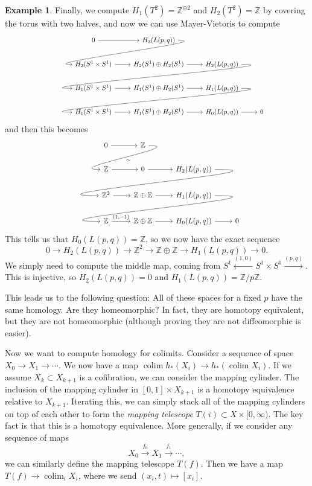 \documentclass[leqno, openany]{memoir}
\theoremstyle{definition}
\newtheorem{exm}[thm]{Example}
\theoremstyle{remark}
\theoremstyle{plain}
\theoremstyle{definition}
\theoremstyle{remark}
\newcommand{\Z}{\mathbb{Z}}
\DeclareMathOperator{\colim}{colim}
\begin{document}
\begin{exm}
    Finally, we compute $H_1(T^2) = \Z^{\oplus 2}$ and $H_2(T^2) = \Z$ by covering the torus with two halves, and now we can use Mayer-Vietoris to compute
    \begin{equation*}
    \begin{tikzcd}
        0 \arrow{r} & H_3(L(p,q)) \arrow[out=0, in=180, looseness=1]{dl} \\
        H_2(S^1 \times S^1) \arrow{r} & H_2(S^1) \oplus H_2(S^1) \arrow{r} & H_2(L(p,q)) \arrow[out=0, in=180, looseness=1]{dll} \\
        H_1(S^1 \times S^1) \arrow{r} & H_1(S^1) \oplus H_2(S^1) \arrow{r} & H_1(L(p,q)) \arrow[out=0, in=180, looseness=1]{dll} \\
        H_1(S^1 \times S^1) \arrow{r} & H_1(S^1) \oplus H_2(S^1) \arrow{r} & H_0(L(p,q)) \arrow{r}  & 0
    \end{tikzcd}
    \end{equation*}
    and then this becomes
    \begin{equation*}
    \begin{tikzcd}
        0 \arrow{r} & \Z \arrow[out=0, in=180, looseness=2]{dl}{\sim} \\
        \Z \arrow{r} & 0 \arrow{r} & H_2(L(p,q)) \arrow[out=0, in=180, looseness=2]{dll} \\
        \Z^2 \arrow{r} & \Z \oplus \Z \arrow{r} & H_1(L(p,q)) \arrow[out=0, in=180, looseness=2]{dll} \\
        \Z \arrow{r}{(1,-1)} & \Z \oplus \Z \arrow{r} & H_0(L(p,q)) \arrow{r}  & 0
    \end{tikzcd}
    \end{equation*}
    This tells us that $H_0(L(p,q)) = \Z$, so we now have the exact sequence
    \[ 0 \to H_2(L(p,q)) \to \Z^2 \to \Z \oplus \Z \to H_1(L(p,q)) \to 0. \]
    We simply need to compute the middle map, coming from $S^1 \xleftarrow{(1,0)} S^1 \times S^1 \xrightarrow{(p,q)}$. This is injective, so $H_2(L(p,q)) = 0$ and $H_1(L(p,q)) = \Z/p\Z$.

    This leads us to the following question: All of these spaces for a fixed $p$ have the same homology. Are they homeomorphic? In fact, they are homotopy equivalent, but they are not homeomorphic (although proving they are not diffeomorphic is easier).
\end{exm}

Now we want to compute homology for colimits. Consider a sequence of space $X_0 \to X_1 \to \cdots$. We now have a map $\colim h_*(X_i) \to h_*(\colim X_i)$. If we assume $X_k \subset X_{k+1}$ is a cofibration, we can consider the mapping cylinder. The inclusion of the mapping cylinder in $[0,1] \times X_{k+1}$ is a homotopy equivalence relative to $X_{k+1}$. Iterating this, we can simply stack all of the mapping cylinders on top of each other to form the \textit{mapping telescope} $T(i) \subset X \times [0, \infty)$. The key fact is that this is a homotopy equivalence. More generally, if we consider any sequence of maps
\[ X_0 \xrightarrow{f_0} X_1 \xrightarrow{f_1} \cdots, \]
we can similarly define the mapping telescope $T(f)$. Then we have a map $T(f) \to \colim_i X_i$, where we send $(x_i, t) \mapsto [x_i]$.
\end{document}
